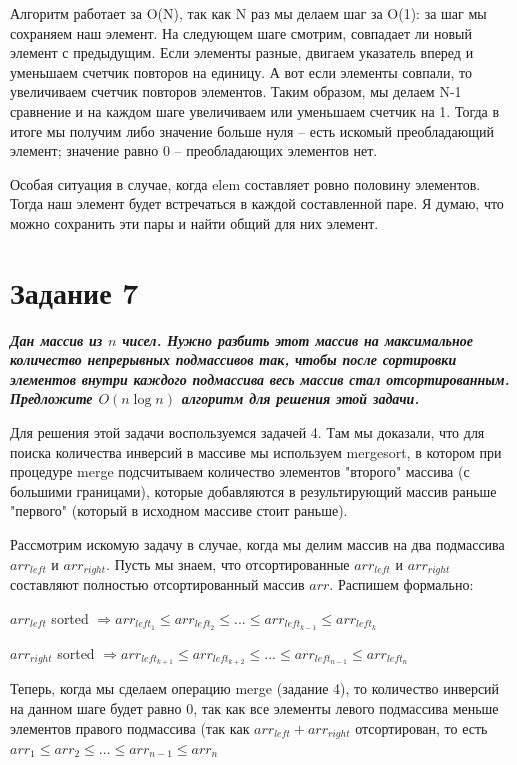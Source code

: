 \documentclass{article}
\begin{document}
Алгоритм работает за O(N), так как N раз мы делаем шаг за O(1): за шаг мы сохраняем наш элемент. На следующем шаге смотрим, совпадает ли новый элемент с предыдущим. Если элементы разные, двигаем указатель вперед и уменьшаем счетчик повторов на единицу.
А вот если элементы совпали, то увеличиваем счетчик повторов элементов. 
Таким образом, мы делаем N-1 сравнение и на каждом шаге увеличиваем или уменьшаем счетчик на 1. Тогда в итоге мы получим либо значение больше нуля -- есть искомый преобладающий элемент; значение равно 0 -- преобладающих элементов нет. 

Особая ситуация в случае, когда elem составляет ровно половину элементов. Тогда наш элемент будет встречаться в каждой составленной паре. Я думаю, что можно сохранить эти пары и найти общий для них элемент. 

\section*{\textbf{Задание 7}}  \textbf{\textit{Дан массив из $n$ чисел. Нужно разбить этот массив на максимальное количество непрерывных подмассивов так, чтобы после сортировки элементов внутри каждого подмассива весь массив стал отсортированным. Предложите $O(n \log n)$ алгоритм для решения этой задачи.}}

Для решения этой задачи воспользуемся задачей 4. Там мы доказали, что для поиска количества инверсий в массиве мы используем mergesort, в котором при процедуре merge подсчитываем количество элементов "второго" массива (с большими границами), которые добавляются в результирующий массив раньше "первого" (который в исходном массиве стоит раньше). 

Рассмотрим искомую задачу в случае, когда мы делим массив на два подмассива $arr_{left}$ и $arr_{right}$. Пусть мы знаем, что отсортированные $arr_{left}$ и $arr_{right}$ составляют полностью отсортированный массив $arr$. Распишем формально:

$arr_{left}$ sorted $\Rightarrow arr_{left_1} \leq arr_{left_2} \leq ... \leq arr_{left_{k-1}} \leq arr_{left_k}$ 

$arr_{right}$ sorted $\Rightarrow arr_{left_{k+1}} \leq arr_{left_{k+2}} \leq ... \leq arr_{left_{n-1}} \leq arr_{left_n}$ 

Теперь, когда мы сделаем операцию merge (задание 4), то количество инверсий на данном шаге будет равно 0, так как все элементы левого подмассива меньше элементов правого подмассива (так как $arr_{left} + arr_{right}$ отсортирован, то есть $arr_1 \leq arr_2 \leq ... \leq arr_{n-1} \leq arr_n$
\end{document}
